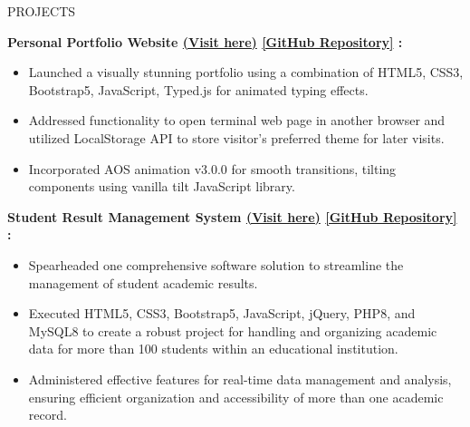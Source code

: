 \documentclass{resume} %
\begin{document}
\begin{rSection}{PROJECTS}
   \vspace{-1.00em}

     \item \textbf{Personal Portfolio Website
    {\href{https://arkapg211002.github.io/}{(Visit here)}}
    {\href{https://github.com/arkapg211002/arkapg211002.github.io}{[GitHub Repository]}} :} 
    \vspace{-0.6em}
    \begin{itemize}
    \setlength\itemsep{-0.6em}
    \item Launched a visually stunning portfolio using a combination of HTML5, CSS3, Bootstrap5, JavaScript, Typed.js for animated typing effects.
    \item Addressed functionality to open terminal web page in another browser and utilized LocalStorage API to store visitor’s preferred theme for later visits.
    \item Incorporated AOS animation v3.0.0 for smooth transitions, tilting components using vanilla tilt JavaScript library.
    \end{itemize}
    
    \item \textbf{Student Result Management System 
    {\href{https://arkaphpcrud.000webhostapp.com/index.php}{(Visit here)}}
    {\href{https://github.com/arkapg211002/Student-Result-Management-System}{[GitHub Repository]}} :}
    \vspace{-0.6em}
    \begin{itemize}
    \setlength\itemsep{-0.6em}
     \item Spearheaded one comprehensive software solution to streamline the management of student academic results.
    \item Executed HTML5, CSS3, Bootstrap5, JavaScript, jQuery, PHP8, and MySQL8 to create a robust project for handling and organizing academic data for more than 100 students within an educational institution.
    \item Administered effective features for real-time data management and analysis, ensuring efficient organization and accessibility of more than one academic record.
    \end{itemize}
    

\end{rSection}
\end{document}
